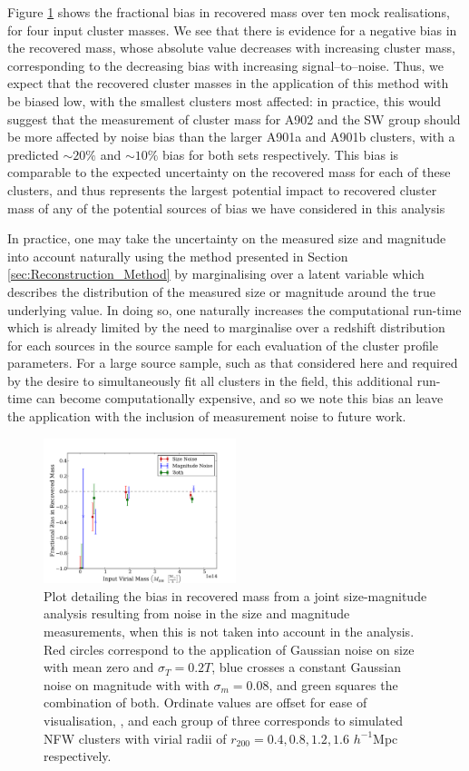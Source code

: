\documentclass[useAMS,usenatbib,times,letter,amssymb]{mn2e}
\begin{document}
Figure \ref{fig:Measurement_Noise_Bias_SM} shows the fractional bias in recovered mass over ten mock realisations, for four input cluster masses. We see that there is evidence for a negative bias in the recovered mass, whose absolute value decreases with increasing cluster mass, corresponding to the decreasing bias with increasing signal--to--noise. Thus, we expect that the recovered cluster masses in the application of this method with be biased low, with the smallest clusters most affected: in practice, this would suggest that the measurement of cluster mass for A902 and the SW group should be more affected by noise bias than the larger A901a and A901b clusters, with a predicted $\sim 20\%$ and $\sim 10\%$ bias for both sets respectively. This bias is comparable to the expected uncertainty on the recovered mass for each of these clusters, and thus represents the largest potential impact to recovered cluster mass of any of the potential sources of bias we have considered in this analysis

In practice, one may take the uncertainty on the measured size and magnitude into account naturally using the method presented in Section \ref{sec:Reconstruction_Method} by marginalising over a latent variable which describes the distribution of the measured size or magnitude around the true underlying value. In doing so, one naturally increases the computational run-time which is already limited by the need to marginalise over a redshift distribution for each sources in the source sample for each evaluation of the cluster profile parameters. For a large source sample, such as that considered here and required by the desire to simultaneously fit all clusters in the field, this additional run-time can become computationally expensive, and so we note this bias an leave the application with the inclusion of measurement noise to future work. 

\begin{figure}
\centering
\includegraphics[width = 0.5\textwidth]{Figures/Mock_Application/NoiseBias_Size_Mag_Both.pdf}
\caption{Plot detailing the bias in recovered mass from a joint size-magnitude analysis resulting from noise in the size and magnitude measurements, when this is not taken into account in the analysis. Red circles correspond to the application of Gaussian noise on size with mean zero and  $\sigma_T = 0.2T$, blue crosses a constant Gaussian noise on magnitude with with $\sigma_m = 0.08$, and green squares the combination of both. Ordinate values are offset for ease of visualisation, , and each group of three corresponds to simulated NFW clusters with virial radii of $r_{200} = 0.4,0.8,1.2,1.6$ $h^{-1}$Mpc respectively.}\label{fig:Measurement_Noise_Bias_SM}
\end{figure}
\end{document}
